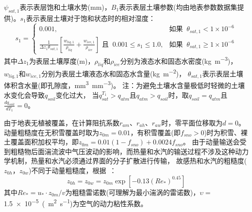 $\psi_{sat,1}$表示表层饱和土壤水势(mm)，$B_1$表示表层土壤\citep{clapp1978empirical}参数(均由地表参数数据集提供)。$s_1$表示表层土壤对于饱和状态时的相对湿度：
\begin{equation}
s_{1}= \begin{cases}
   0.001, & \text {如果 }\ \theta_{sat, 1}<1 \times 10^{-6} \\ 
   \frac{1}{\Delta z_{1} \theta_{sat, 1}}\left[\frac{w_{liq, 1}}{\rho_{liq}}+\frac{w_{ice, 1}}{\rho_{ice}}\right]  \text{ 且  }\  0.001 \leqslant s_{1} \leqslant 1.0, & \text {如果 }\ \theta_{sat, 1} \geqslant 1 \times 10^{-6}
   \end{cases}
\end{equation}
其中$\Delta z_{1}$为表层土壤厚度(m)，$\rho_{liq}$和$\rho_{ice}$分别为液态水和固态水密度(\unit{kg.m^{-3}})，
$w_{liq,1}$和$w_{ice,1}$分别为表层土壤液态水和固态水含量(\unit{kg.m^{-2}})，
$\theta_{sat,1}$表示表层土壤体积含水量(即孔隙度，\unit{mm^3.mm^{-3}})。
注：为避免土壤水含量极低时轻微的土壤水变化会导致$q_{soil}$变化过大，
当$q_{sat}^{T_1}>q_{atm}$且$q_{atm}>q_{soil}$时，取$q_{soil} = q_{atm}$且$\frac{dq_{soil}}{dT_1} = 0$。


由于地表无植被覆盖，在计算阻抗系数$r_{am}$、$r_{ah}$、$r_{aw}$时，零平面位移取为$d=0$。动量粗糙度在无积雪覆盖时取为$z_{0m}=0.01$，有积雪覆盖(即$f_{sno}>0$)时为积雪、裸土覆盖面积加权平均，即$z_{0m}=0.01\left( 1-f_{sno} \right )+ 0.0024 f_{sno}$。
由于动量输送会受到粗糙物后面湍流波中气压波动的影响，而热量和水汽的输送过程不涉及这种动力学机制，热量和水汽必须通过界面的分子扩散进行传输，
故感热和水汽的粗糙度($z_{0h}$，$z_{0w}$)不同于动量粗糙度，根据~\citet{zeng1998effect}：
\begin{equation}\label{z0hw}
z_{0 h} = z_{0 w} = z_{0 m} \exp \left[-0.13\left(Re_{*}\right)^{0.45}\right]
\end{equation}
其中$Re_{*} = u_{*} \cdot z_{0 m} / v$为粗糙雷诺数(可理解为最小湍涡的雷诺数)，$\upsilon=$ \qty{1.5e-5}{(m^2.s^{-1}})为空气的动力粘性系数。


